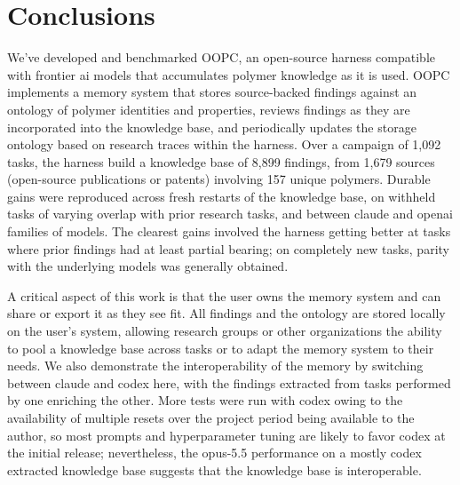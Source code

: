 \documentclass[journal=mamobx,manuscript=article]{achemso}
\begin{document}
\section{Conclusions}
\label{sec:conclusions}

We've developed and benchmarked OOPC, an open-source harness compatible with frontier ai models that accumulates polymer knowledge as it is used.
OOPC implements a memory system that stores source-backed findings against an ontology of polymer identities and properties, reviews findings as they are incorporated into the knowledge base, and periodically updates the storage ontology based on research traces within the harness.
Over a campaign of 1,092 tasks, the harness build a knowledge base of 8,899 findings, from 1,679 sources (open-source publications or patents) involving 157 unique polymers.
Durable gains were reproduced across fresh restarts of the knowledge base, on withheld tasks of varying overlap with prior research tasks, and between claude and openai families of models.
The clearest gains involved the harness getting better at tasks where prior findings had at least partial bearing; on completely new tasks, parity with the underlying models was generally obtained.

A critical aspect of this work is that the user owns the memory system and can share or export it as they see fit.
All findings and the ontology are stored locally on the user's system, allowing research groups or other organizations the ability to pool a knowledge base across tasks or to adapt the memory system to their needs.
We also demonstrate the interoperability of the memory by switching between claude and codex here, with the findings extracted from tasks performed by one enriching the other.
More tests were run with codex owing to the availability of multiple resets over the project period being available to the author, so most prompts and hyperparameter tuning are likely to favor codex at the initial release; nevertheless, the opus-5.5 performance on a mostly codex extracted knowledge base suggests that the knowledge base is interoperable.
\end{document}
